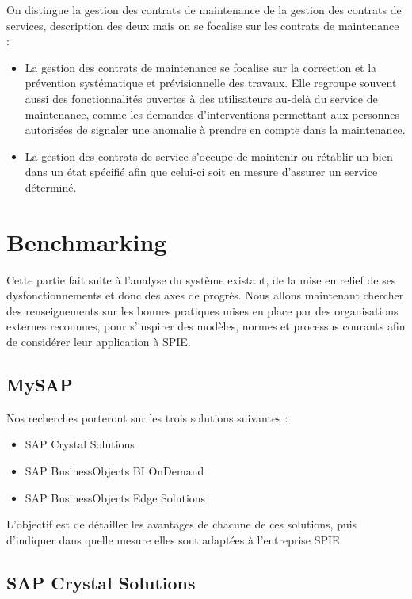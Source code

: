 On distingue la gestion des contrats de maintenance de la gestion des contrats de services, description des deux mais on se focalise sur les contrats de maintenance :

\begin{itemize}
\item La gestion des contrats de maintenance se focalise sur la correction et la prévention systématique et prévisionnelle des travaux. Elle regroupe souvent aussi des fonctionnalités ouvertes à des utilisateurs au-delà du service de maintenance, comme les demandes d’interventions permettant aux personnes autorisées de signaler une anomalie à prendre en compte dans la maintenance.
\item La gestion des contrats de service s’occupe de maintenir ou rétablir un bien dans un état spécifié afin que celui-ci soit en mesure d’assurer un service déterminé.
\end{itemize}

\section{Benchmarking}

Cette partie fait suite à l'analyse du système existant, de la mise en relief de ses dysfonctionnements et donc des axes de progrès. Nous allons maintenant chercher des renseignements sur les bonnes pratiques mises en place par des organisations externes reconnues, pour s'inspirer des modèles, normes et processus courants afin de considérer leur application à SPIE.

\subsection{MySAP}

Nos recherches porteront sur les trois solutions suivantes :

\begin{itemize}
\item SAP Crystal Solutions
\item SAP BusinessObjects BI OnDemand
\item SAP BusinessObjects Edge Solutions
\end{itemize}

L'objectif est de détailler les avantages de chacune de ces solutions, puis d'indiquer dans quelle mesure elles sont adaptées à l’entreprise SPIE.

\subsection{SAP Crystal Solutions}

